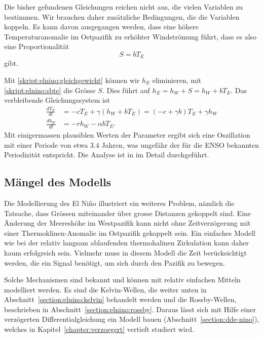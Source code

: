 Die bisher gefundenen Gleichungen reichen nicht aus, die vielen Variablen
zu bestimmen.
Wir brauchen daher zusätzliche Bedingungen, die die Variablen koppeln.
Es kann davon ausgegangen werden, dass eine höhere Temperaturanomalie
im Ostpazifik zu erhöhter Windströmung führt, dass es also eine
Proportionalität 
\begin{equation}
S=bT_E
\label{skript:elnino:sbte}
\end{equation}
gibt.

Mit \eqref{skript:elnino:gleichgewicht} können wir $h_E$ eliminieren,
mit \eqref{skript:elnino:sbte} die Grösse $S$.
Dies führt auf $h_E=h_W+S=h_W+bT_E$.
Das verbleibende Gleichungssystem ist
\begin{align*}
\frac{dT_E}{dt}
&=
-cT_E + \gamma(h_W+bT_E)
=
(-c+\gamma b)T_E
+
\gamma h_W
\\
\frac{dh_W}{dt}
&=
-rh_W - \alpha b T_E.
\end{align*}
Mit einigermassen plausiblen Werten der Parameter ergibt sich eine
Oszillation mit einer Periode von etwa $3.4$ Jahren, was ungefähr der
für die ENSO bekannten Periodizität entspricht.
Die Analyse ist in \cite{skript:kaperengler} im Detail durchgeführt.


\subsection{Mängel des Modells\label{subsection:maengel des modells}}
Die Modellierung des El Niño illustriert ein weiteres Problem, nämlich
die Tatsache, dass Grössen miteinander über grosse Distanzen gekoppelt
sind.
Eine Änderung der Meereshöhe im Westpazifik kann nicht ohne Zeitverzögerung
mit einer Thermoklinen-Anomalie im Ostpazifik gekoppelt sein.
Ein einfaches Modell wie bei der relativ langsam ablaufenden thermohalinen
Zirkulation kann daher kaum erfolgreich sein.
Vielmehr muss in diesem Modell die Zeit berücksichtigt werden, die ein
Signal benötigt, um sich durch den Pazifik zu bewegen.

Solche Mechanismen sind bekannt und können mit relativ einfachen
Mitteln modelliert werden.
Es sind die Kelvin-Wellen, die weiter unten in
Abschnitt~\ref{section:elnino:kelvin}
behandelt werden und die Rossby-Wellen, beschrieben in
Abschnitt~\ref{section:elnino:rossby}.
Daraus lässt sich mit Hilfe einer verzögerten Differentialgleichung
ein Modell bauen (Abschnitt~\ref{section:dde-nino}), welches in
Kapitel~\ref{chapter:verzoegert} vertieft studiert wird.


